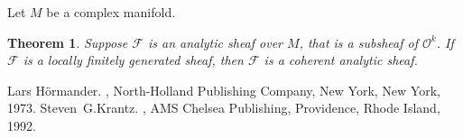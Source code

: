 \documentclass[12pt]{article}
\theoremstyle{theorem}
\newtheorem*{thm}{Theorem}
\theoremstyle{definition}
\theoremstyle{remark}
\begin{document}
Let $M$ be a complex manifold.

\begin{thm}
Suppose $\mathcal{F}$ is an analytic sheaf over $M$, that is a subsheaf of $\mathcal{O}^k$.
If $\mathcal{F}$ is a locally finitely generated sheaf, then $\mathcal{F}$
is a coherent analytic sheaf.
\end{thm}

\begin{thebibliography}{9}
Lars H\"ormander.
{\em {}},
North-Holland Publishing Company, New York, New York, 1973.
Steven~G.\@ Krantz.
{\em {}},
AMS Chelsea Publishing, Providence, Rhode Island, 1992.
\end{thebibliography}
\end{document}
